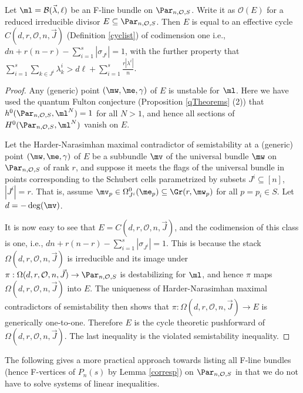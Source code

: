 \begin{lemma}
\notready\label{divisorE}
Let $\ml=\mathcal{B}(\vec{\lambda},\ell)$ be an F-line bundle on $\Par_{n,\mathcal{O},S}$. Write it as $\mathcal{O}(E)$ for a reduced irreducible divisor  $E\subseteq \Par_{n,\mathcal{O},S}$.
Then $E$ is equal to an effective cycle $C(d,r,\mathcal{O},n,\vec{J})$ (Definition  \ref{cyclist})  of codimension one i.e., $dn  +r(n-r)-\sum_{i=1}^s |\sigma_{J^i}|=1$, with the further property that
$\sum_{i=1}^s \sum_{k\in J^i} \lambda^i_k> d\ell +\sum_{i=1}^s \frac{r|\lambda^i|}{n}$.
\end{lemma}
\begin{proof}
Any (generic) point $(\mw,\me,\gamma)$ of $E$ is unstable for $\ml$. Here we have used the quantum Fulton conjecture (Proposition \ref{qTheorems} (2)) that $h^0(\Par_{n,{\mathcal{O}},S},\ml^N)=1$ for all $N>1$, and hence all sections of $H^0(\Par_{n,{\mathcal{O}},S},\ml^N)$ vanish on $E$.

Let the Harder-Narasimhan maximal contradictor of semistability at a (generic) point $(\mw,\me,\gamma)$ of $E$ be a subbundle $\mv$ of the universal bundle $\mw$ on  $\Par_{n,{\mathcal{O}},S}$ of rank $r$, and suppose it meets the flags of the universal bundle in points corresponding to the Schubert cells parametrized by subsets $J^i\subseteq[n]$, $|J^i|=r$. That is, assume  $\mv_p\in \Omega^0_{J^i}(\me_p)\subseteq \Gr(r,\mw_p)$ for all $p=p_i\in S$.  Let $d=-\deg(\mv)$.

It is now easy to see that $E=C(d,r,\mathcal{O},n,\vec{J})$, and the  codimension of this class is one, i.e., $dn+r(n-r)-\sum_{i=1}^s |\sigma_{J^i}|=1$. This is because the stack $\Omega(d,r,\mathcal{O},n,\vec{J})$ is irreducible and its image under $\pi:\Omega(d,r,\mathcal{O},n,\vec{J})\to
\Par_{n,{\mathcal{O}},S}$ is destabilizing for $\ml$, and hence $\pi$ maps $\Omega(d,r,\mathcal{O},n,\vec{J})$ into $E$. The uniqueness of Harder-Narasimhan maximal contradictors of semistability then shows that $\pi:\Omega(d,r,\mathcal{O},n,\vec{J})\to E$ is generically one-to-one. Therefore $E$ is the cycle theoretic pushforward of $\Omega(d,r,\mathcal{O},n,\vec{J})$. The last inequality is the violated semistability inequality.
\end{proof}
The following gives a more practical approach towards listing all F-line bundles (hence F-vertices of $P_n(s)$ by Lemma \ref{corresp}) on $\Par_{n,\mathcal{O},S}$ in that we do not have to solve systems of linear inequalities.
